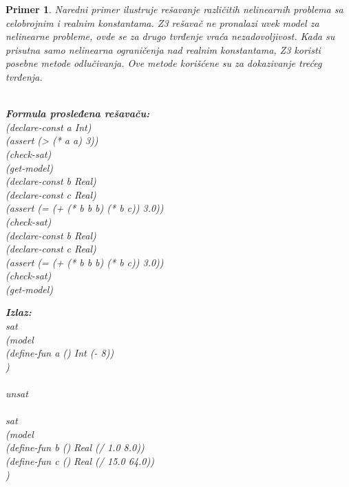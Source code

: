 \documentclass[12pt,oneside]{memoir}
\newcommand\tab[1][0.5cm]{\hspace*{#1}}
\newtheorem{primer}{Primer}
\begin{document}
\begin{primer} Naredni primer ilustruje rešavanje različitih nelinearnih problema sa celobrojnim i realnim konstantama. Z3 rešavač ne pronalazi uvek model za nelinearne probleme, ovde se za drugo tvrđenje vraća nezadovoljivost. Kada su prisutna samo nelinearna ograničenja nad realnim konstantama, Z3 koristi posebne metode odlučivanja. Ove metode korišćene su za dokazivanje trećeg tvrđenja.\\ \\
\begin{minipage}[b]{0.43\textwidth}
\textbf{Formula prosleđena rešavaču:}
\\(declare-const a Int)
\\(assert (> (* a a) 3))
\\(check-sat)
\\(get-model)
\\(declare-const b Real)
\\(declare-const c Real)
\\(assert (= (+ (* b b b) (* b c)) 3.0))
\\(check-sat)
\\(declare-const b Real)
\\(declare-const c Real)
\\(assert (= (+ (* b b b) (* b c)) 3.0))
\\(check-sat)
\\(get-model)

\end{minipage}
\hspace{1cm}
\begin{minipage}[t]{0.45\textwidth}
\vspace{-8.5cm}
\textbf{Izlaz:}
\\sat 
\\(model 
\\\tab(define-fun a () Int (- 8))
\\) 
\\
\\unsat 
\\
\\sat 
\\(model 
\\\tab(define-fun b () Real (/ 1.0 8.0)) 
\\\tab(define-fun c () Real (/ 15.0 64.0))
\\)
\end{minipage}
\end{primer}
\end{document}
